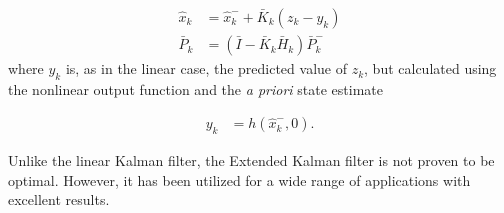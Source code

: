 \begin{align}
\hat{x}_k &=\hat{x}^-_{k}+\bar{K}_k(z_k-y_k)\\
\label{kalmanVariance}
\bar{P}_k &=(\bar{I}-\bar{K}_k\bar{H}_k)\bar{P}^-_k
\end{align}
\noindent
where $y_k$ is, as in the linear case, the predicted value of $z_k$, but calculated using the nonlinear output function and the \textit{a priori} state estimate

\begin{align}
y_k &= h(\hat{x}^-_k,0).
\end{align}

Unlike the linear Kalman filter, the Extended Kalman filter is not proven to be optimal. However, it has been utilized for a wide range of applications with excellent results.
